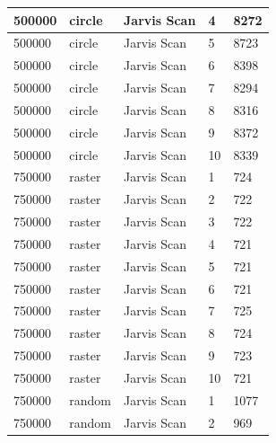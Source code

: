 \documentclass[12pt]{article}
\begin{document}
\begin{longtable}{|l|l|l|l|l|}
500000       & circle            & Jarvis Scan & 4          & 8272                          \\ \hline
500000       & circle            & Jarvis Scan & 5          & 8723                          \\ \hline
500000       & circle            & Jarvis Scan & 6          & 8398                          \\ \hline
500000       & circle            & Jarvis Scan & 7          & 8294                          \\ \hline
500000       & circle            & Jarvis Scan & 8          & 8316                          \\ \hline
500000       & circle            & Jarvis Scan & 9          & 8372                          \\ \hline
500000       & circle            & Jarvis Scan & 10         & 8339                          \\ \hline
750000       & raster            & Jarvis Scan & 1          & 724                           \\ \hline
750000       & raster            & Jarvis Scan & 2          & 722                           \\ \hline
750000       & raster            & Jarvis Scan & 3          & 722                           \\ \hline
750000       & raster            & Jarvis Scan & 4          & 721                           \\ \hline
750000       & raster            & Jarvis Scan & 5          & 721                           \\ \hline
750000       & raster            & Jarvis Scan & 6          & 721                           \\ \hline
750000       & raster            & Jarvis Scan & 7          & 725                           \\ \hline
750000       & raster            & Jarvis Scan & 8          & 724                           \\ \hline
750000       & raster            & Jarvis Scan & 9          & 723                           \\ \hline
750000       & raster            & Jarvis Scan & 10         & 721                           \\ \hline
750000       & random            & Jarvis Scan & 1          & 1077                          \\ \hline
750000       & random            & Jarvis Scan & 2          & 969                           \\ \hline

\end{longtable}
\end{document}
